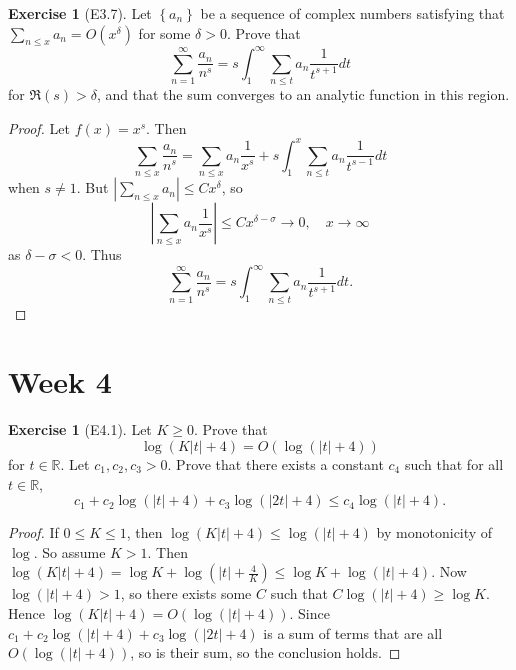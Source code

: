 \documentclass[reqno]{amsart}
\theoremstyle{definition}
\newtheorem{exercise}[theorem]{Exercise}
\theoremstyle{remark}
\begin{document}
\begin{exercise}[E3.7]
    Let $\left\{ a_n \right\} $ be a sequence of complex numbers
    satisfying that $\sum_{n \le x} a_n = O\left( x^{\delta}
    \right) $ for some $\delta > 0$. Prove that
    \[
    \sum_{n=1}^{\infty} \frac{a_n}{n^{s}} = s
    \int_{1}^{\infty} \sum_{n\le t} a_n \frac{1}{t^{s+1}} dt 
    \] 
    for $\Re(s) > \delta$, and that the sum converges
    to an analytic function in this region.
\end{exercise}

\begin{proof}
    Let $f(x) = x^{s}$. Then
    \[
    \sum_{n\le x} \frac{a_n}{n^{s}}
    = \sum_{n\le x}a_n \frac{1}{x^{s}} + s
    \int_{1}^{x} \sum_{n\le t} a_n \frac{1}{t^{s-1}} dt
    \] 
    when $s \neq 1$. But
    $\left| \sum_{n \le x}a_n \right| 
    \le C x^{\delta} $, so
    \[
    \left| \sum_{n\le x} a_n \frac{1}{x^{s}} \right|
    \le C x^{\delta - \sigma} \to 0, \quad x \to \infty
    \] 
    as $\delta - \sigma < 0$.
    Thus
    \[
    \sum_{n=1}^{\infty} \frac{a_n}{n^{s}} = 
    s \int_{1}^{\infty} \sum_{n\le t} a_n \frac{1}{t^{s+1} }dt . 
    \] 
\end{proof}


\section{Week 4}

\begin{exercise}[E4.1]
    Let $K \ge 0$. Prove that
    \[
    \log \left( K \left| t \right| +4 \right) =
    O\left( \log \left( \left| t \right| +4 \right)  \right) 
    \] 
    for $t \in \mathbb{R}$. Let
    $c_1, c_2, c_3 > 0$. Prove that there exists a constant
    $c_4$ such that for all $t \in \mathbb{R}$,
    \[
    c_1 + c_2 \log\left( \left| t \right| +4 \right) +
    c_3 \log\left( \left| 2t \right| +4 \right) 
    \le c_4 \log \left( \left| t \right| +4 \right) .
    \] 
\end{exercise}

\begin{proof}
    If $0 \le K \le 1$, then
    $\log \left( K \left| t \right| +4 \right) \le 
    \log \left( \left| t \right| +4 \right) $ by
    monotonicity of $\log$.
    So assume  $K > 1$. Then
    $\log \left( K \left| t \right| +4 \right) 
    = \log K + \log \left( \left| t \right|  + \frac{4}{K} \right) 
    \le \log K + \log \left( \left| t \right| +4 \right) $.
    Now $\log \left( \left| t \right| +4 \right) > 1$, so
    there exists some $C$ such that
    $C \log \left( \left| t \right| +4 \right) \ge \log K$.
    Hence
    $\log \left( K \left| t \right| +4 \right) =
    O \left( \log \left( \left| t \right| +4 \right)  \right) $.
    Since
    $c_1 + c_2 \log\left( \left| t \right| +4 \right) +
    c_3 \log \left( \left| 2t \right| +4 \right) $ is a
    sum of terms that are all
    $O\left( \log \left( \left| t \right| +4 \right)  \right) $, so
    is their sum, so the conclusion holds.
\end{proof}
\end{document}

